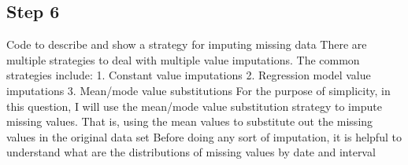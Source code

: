 \documentclass[
]{article}
\begin{document}
\hypertarget{step-6}{%
\subsection{Step 6}\label{step-6}}

Code to describe and show a strategy for imputing missing data There are
multiple strategies to deal with multiple value imputations. The common
strategies include: 1. Constant value imputations 2. Regression model
value imputations 3. Mean/mode value substitutions For the purpose of
simplicity, in this question, I will use the mean/mode value
substitution strategy to impute missing values. That is, using the mean
values to substitute out the missing values in the original data set
Before doing any sort of imputation, it is helpful to understand what
are the distributions of missing values by date and interval
\end{document}
